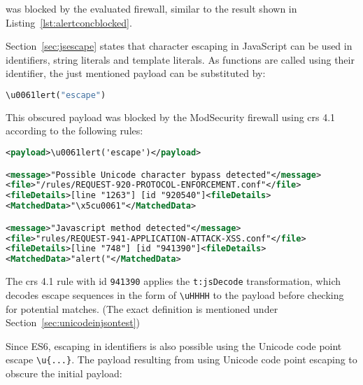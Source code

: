 was blocked by the evaluated firewall, similar to the result shown in Listing~\ref{lst:alertconcblocked}.

%

Section~\ref{sec:jsescape} states that character escaping in JavaScript can be used in identifiers, string literals and template literals.
As functions are called using their identifier, the just mentioned payload can be substituted by:

\begin{lstlisting}[style=basicStyle, language=Python]
\u0061lert("escape")
\end{lstlisting}

This obscured payload was blocked by the ModSecurity firewall using \acrshort{crs} 4.1 according to the following rules:

\begin{lstlisting}[style=ruleStyle, language=XML, caption=\textbackslash u0061lert('escape') blocked]
<payload>\u0061lert('escape')</payload>

<message>"Possible Unicode character bypass detected"</message>
<file>"/rules/REQUEST-920-PROTOCOL-ENFORCEMENT.conf"</file>
<fileDetails>[line "1263"] [id "920540"]<fileDetails>
<MatchedData>"\x5cu0061"</MatchedData>

<message>"Javascript method detected"</message>
<file>"rules/REQUEST-941-APPLICATION-ATTACK-XSS.conf"</file>
<fileDetails>[line "748"] [id "941390"]<fileDetails>
<MatchedData>"alert("</MatchedData>
\end{lstlisting}

The \acrshort{crs} 4.1 rule with id \verb|941390| applies the \verb|t:jsDecode| transformation, which decodes escape sequences in the form of \verb|\uHHHH| to the payload before checking for potential matches. \cite{modsec/transjsdecode} (The exact definition is mentioned under Section~\ref{sec:unicodeinjsontest})

Since ES6, escaping in identifiers is also possible using the Unicode code point escape \verb|\u{...}|. The payload resulting from using Unicode code point escaping to obscure the initial payload:

